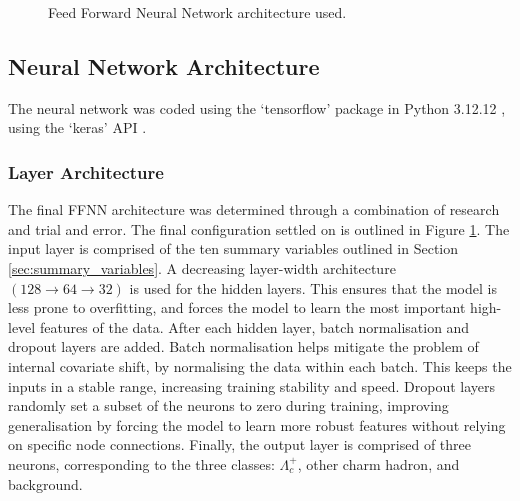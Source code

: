 \documentclass[12pt]{article}
\begin{document}
\begin{figure}
    \caption{Feed Forward Neural Network architecture used.}
    \label{fig:nn_architecture}
\end{figure}

\subsection{Neural Network Architecture}
The neural network was coded using the `tensorflow' package in Python 3.12.12 \cite{tensorflow}, using the `keras' API \cite{keras}.

\subsubsection{Layer Architecture}
The final FFNN architecture was determined through a combination of research and trial and error. The final configuration settled on is outlined in Figure \ref{fig:nn_architecture}. The input layer is comprised of the ten summary variables outlined in Section \ref{sec:summary_variables}. A decreasing layer-width architecture $(128 \rightarrow 64 \rightarrow 32)$ is used for the hidden layers. This ensures that the model is less prone to overfitting, and forces the model to learn the most important high-level features of the data. After each hidden layer, batch normalisation and dropout layers are added. Batch normalisation helps mitigate the problem of internal covariate shift, by normalising the data within each batch. This keeps the inputs in a stable range, increasing training stability and speed. Dropout layers randomly set a subset of the neurons to zero during training, improving generalisation by forcing the model to learn more robust features without relying on specific node connections. Finally, the output layer is comprised of three neurons, corresponding to the three classes: $\Lambda_c^+$, other charm hadron, and background.
\end{document}
